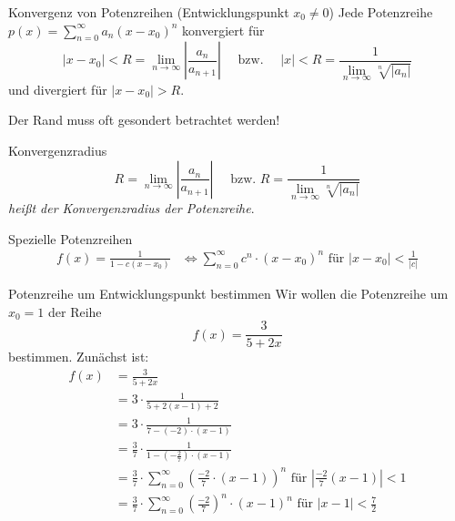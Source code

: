 \documentclass[german]{../spicker}
\renewcommand{\abs}[1]{\left| #1 \right|}
\begin{document}
\begin{defi}{Konvergenz von Potenzreihen (Entwicklungspunkt $x_0 \neq 0$)}
    Jede Potenzreihe $p(x) = \sum^\infty_{n=0} a_n (x-x_0)^n$ konvergiert für
    $$
        \abs{x-x_0} < R = \lim_{n\to\infty} \abs{\frac{a_n}{a_{n+1}}}\quad  \text{ bzw. } \quad \abs{x} < R = \frac{1}{\lim_{n\to\infty} \sqrt[n]{\abs{a_n}}}
    $$
    und divergiert für $\abs{x-x_0} > R$.

    Der Rand muss oft gesondert betrachtet werden!
\end{defi}

\begin{defi}{Konvergenzradius}
    $$
        R = \lim_{n\to\infty} \abs{\frac{a_n}{a_{n+1}}}\quad  \text{ bzw. } R = \frac{1}{\lim_{n\to\infty} \sqrt[n]{\abs{a_n}}}
    $$
    \emph{heißt der Konvergenzradius der Potenzreihe}.
\end{defi}

\begin{bonus}{Spezielle Potenzreihen}
    $$
        \begin{aligned}
            f(x) = \frac{1}{1-c(x-x_0)} & \iff \sum^\infty_{n=0} c^n \cdot (x-x_0)^n \text{ für } \abs{x-x_0} < \frac{1}{\abs{c}}
        \end{aligned}
    $$
\end{bonus}

\begin{example}{Potenzreihe um Entwicklungspunkt bestimmen}
    Wir wollen die Potenzreihe um $x_0 = 1$ der Reihe $$f(x) = \frac{3}{5+2x}$$ bestimmen.
    Zunächst ist:
    $$
        \begin{aligned}
            f(x) & ={} \frac{3}{5+2x}                                                                                                       \\
                 & ={} 3\cdot \frac{1}{5+2(x-1) + 2}                                                                                        \\
                 & ={} 3\cdot \frac{1}{7- (-2) \cdot (x-1)}                                                                                 \\
                 & ={} \frac{3}{7}\cdot \frac{1}{1- (-\frac{2}{7}) \cdot (x-1)}                                                             \\
                 & ={} \frac{3}{7}\cdot \sum^\infty_{n=0} \left(\frac{-2}{7} \cdot (x-1)\right)^n \text{ für } \abs{\frac{-2}{7} (x-1)} < 1 \\
                 & ={} \frac{3}{7}\cdot \sum^\infty_{n=0} \left(\frac{-2}{7}\right)^n \cdot (x-1)^n \text{ für } \abs{x-1} < \frac{7}{2}
        \end{aligned}
    $$
\end{example}
\end{document}
